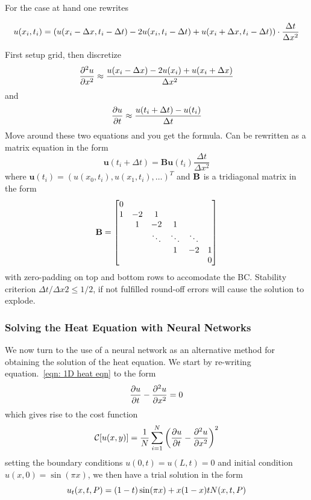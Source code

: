 \documentclass[reprint, english, nofootinbib]{revtex4-2}
\begin{document}
For the case at hand one rewrites 
\begin{widetext}
\begin{equation}
    u(x_i,t_i) = \qty(u(x_i - \Delta x,t_i - \Delta t) - 
                 2u(x_i,t_i-\Delta t) + 
                 u(x_i+\Delta x,t_i-\Delta t)) \cdot \frac{\Delta t}{\Delta x^2} 
\end{equation}
\end{widetext}
First setup grid, then discretize 
\begin{equation}
   \pdv[2]{u}{x} \approx \frac{u(x_i-\Delta x)-2u(x_i) + u(x_i+\Delta x)}{\Delta x^2} 
\end{equation}
and
\begin{equation}
    \pdv{u}{t} \approx \frac{u(t_i + \Delta t) - u(t_{i})}{\Delta t}
\end{equation}
Move around these two equations and you get the formula. Can be rewritten as a matrix equation in the form
\begin{equation}
    \pmb u(t_i+\Delta t) = \mathbf{B} \pmb u(t_i) \frac{\Delta t}{\Delta x^2}
\end{equation}
where $\pmb u(t_i) = (u(x_0, t_i), u(x_1, t_i), \dots)^T$ and $\bf B$ is a tridiagonal matrix in the form
\begin{equation} \label{eqn: Az = b}
    \mathbf B = \qty[
    \begin{matrix}
    0 \\
    1 & -2 & 1 \\
    & 1 & -2 & 1 \\
    && \ddots & \ddots & \ddots \\
    &&& 1 & -2 & 1 \\
    &&&&& 0
    \end{matrix}
    ]
 \end{equation}
with zero-padding on top and bottom rows to accomodate the BC. Stability criterion $\Delta t/\Delta x2 \leq 1/2$, if not fulfilled round-off errors will cause the solution to explode. 

\subsubsection{Solving the Heat Equation with Neural Networks}
\noindent
We now turn to the use of a neural network as an alternative method for obtaining the solution of the heat equation. We start by re-writing equation.~\ref{eqn: 1D heat eqn} to the form
\begin{equation}
    \pdv{u}{t} - \pdv[2]{u}{x} = 0
\end{equation}
which gives rise to the cost function 
\begin{equation}
    \mathcal C\qty[u\qty(x, y)] = \frac{1}{N}\sum_{i=1}^N \qty(\pdv{u}{t} - \pdv[2]{u}{x})^2
\end{equation}
setting the boundary conditions $u(0, t) = u(L, t) = 0$ and initial condition $u(x, 0) = \sin(\pi x)$, we then have a trial solution in the form
\begin{equation}
    u_t(x, t, P) = \qty(1 - t)\sin(\pi x) + x(1 - x)t N(x, t, P)
\end{equation}
\end{document}
